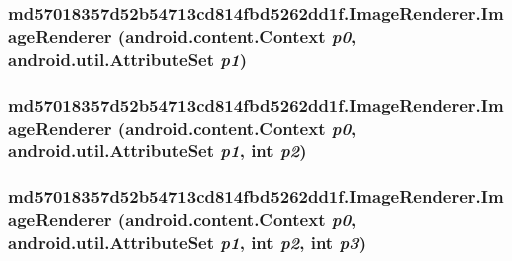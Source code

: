 \hypertarget{classmd57018357d52b54713cd814fbd5262dd1f_1_1_image_renderer_0947c7c3bb9345bab25385a875725446}{
\subsubsection[{ImageRenderer}]{\setlength{\rightskip}{0pt plus 5cm}md57018357d52b54713cd814fbd5262dd1f.ImageRenderer.ImageRenderer (android.content.Context {\em p0}, \/  android.util.AttributeSet {\em p1})}}
\label{classmd57018357d52b54713cd814fbd5262dd1f_1_1_image_renderer_0947c7c3bb9345bab25385a875725446}


\hypertarget{classmd57018357d52b54713cd814fbd5262dd1f_1_1_image_renderer_4cbfa52301eb9f06d519eac869c63a3a}{
\subsubsection[{ImageRenderer}]{\setlength{\rightskip}{0pt plus 5cm}md57018357d52b54713cd814fbd5262dd1f.ImageRenderer.ImageRenderer (android.content.Context {\em p0}, \/  android.util.AttributeSet {\em p1}, \/  int {\em p2})}}
\label{classmd57018357d52b54713cd814fbd5262dd1f_1_1_image_renderer_4cbfa52301eb9f06d519eac869c63a3a}


\hypertarget{classmd57018357d52b54713cd814fbd5262dd1f_1_1_image_renderer_a5715d5e475e6798cbd44a0ea396efcf}{
\subsubsection[{ImageRenderer}]{\setlength{\rightskip}{0pt plus 5cm}md57018357d52b54713cd814fbd5262dd1f.ImageRenderer.ImageRenderer (android.content.Context {\em p0}, \/  android.util.AttributeSet {\em p1}, \/  int {\em p2}, \/  int {\em p3})}}
\label{classmd57018357d52b54713cd814fbd5262dd1f_1_1_image_renderer_a5715d5e475e6798cbd44a0ea396efcf}




